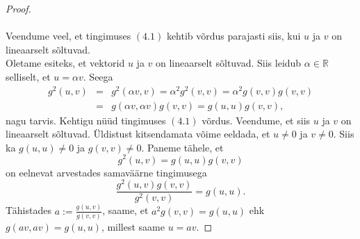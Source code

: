 \documentclass[a4paper,12pt]{article}
\numberwithin{equation}{section}
\begin{document}
\begin{proof}
\paragraph{}
Veendume veel, et tingimuses $(4.1)$ kehtib võrdus parajasti siis, kui $u$ ja $v$ on lineaarselt sõltuvad.\\
Oletame esiteks, et vektorid $u$ ja $v$ on lineaarselt sõltuvad. Siis leidub $\alpha \in \mathbb{R}$ selliselt, et $u = \alpha v$. Seega
\begin{eqnarray*}
g^2\left(u,v\right) &=& g^2 \left(\alpha v,v\right) = \alpha^2 g^2 \left(v,v\right) = \alpha^2 g \left(v,v\right) g \left(v,v\right) \\
&=& g \left(\alpha v,\alpha v\right)g \left( v,v\right) = g \left(u,u\right)g \left(v,v\right),
\end{eqnarray*}
nagu tarvis.
\newline
Kehtigu nüüd tingimuses $(4.1)$ võrdus. Veendume, et siis $u$ ja $v$ on lineaarselt sõltuvad. Üldistust kitsendamata võime eeldada, et $u \neq 0$ ja $v \neq 0$. Siis ka $g \left(u,u\right) \neq 0$ ja $g \left(v,v\right) \neq 0$. Paneme tähele, et
\[g^2 \left(u, v \right) = g \left(u, u \right) g \left(v, v \right)\]
on eelnevat arvestades samaväärne tingimusega
\[\frac{g^2 \left(u, v \right) g \left(v, v \right)}{g^2 \left(v, v \right) } = g \left(u, u \right). \]
Tähistades $a := \frac{g \left(u, v \right) }{g \left(v, v \right) }$, saame, et $a^2 g \left(v, v \right) = g \left(u, u \right)$ ehk $g \left(av, av \right) = g \left(u, u \right)$, millest saame $u = av$.

\end{proof}
\vfill 
\end{document}
